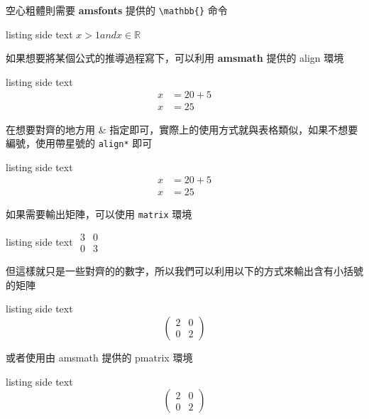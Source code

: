空心粗體則需要 \textbf{amsfonts} 提供的 \verb`\mathbb{}` 命令

\begin{tcblisting}{listing side text}
$
x > 1 and x \in \mathbb{R}
$
\end{tcblisting}

如果想要將某個公式的推導過程寫下，可以利用 \textbf{amsmath} 提供的 align 環境

\begin{tcblisting}{listing side text}
\begin{align}
x &= 20 +5\\
x &= 25
\end{align}
\end{tcblisting}

在想要對齊的地方用 \& 指定即可，實際上的使用方式就與表格類似，如果不想要編號，使用帶星號的 \verb`align*` 即可

\begin{tcblisting}{listing side text}
\begin{align*}
x &= 20 +5\\
x &= 25
\end{align*}
\end{tcblisting}

如果需要輸出矩陣，可以使用 \verb`matrix` 環境

\begin{tcblisting}{listing side text}
$
\begin{matrix}
3 & 0\\
0 & 3
\end{matrix}
$
\end{tcblisting}

但這樣就只是一些對齊的的數字，所以我們可以利用以下的方式來輸出含有小括號的矩陣

\begin{tcblisting}{listing side text}
\[
\left(\begin{matrix}
2 & 0\\
0 & 2
\end{matrix}\right)
\]
\end{tcblisting}

或者使用由 amsmath 提供的 pmatrix 環境

\begin{tcblisting}{listing side text}
\[
\begin{pmatrix}
2 & 0\\
0 & 2
\end{pmatrix}
\]
\end{tcblisting}

